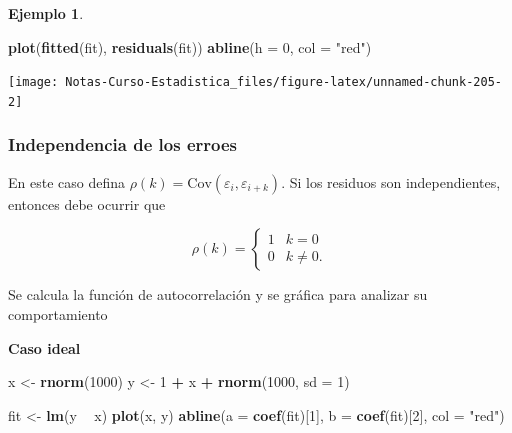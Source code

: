 \documentclass[
  12pt,
]{book}
\newenvironment{Shaded}{\begin{snugshade}}{\end{snugshade}}
\newcommand{\DataTypeTok}[1]{\textcolor[rgb]{0.13,0.29,0.53}{#1}}
\newcommand{\DecValTok}[1]{\textcolor[rgb]{0.00,0.00,0.81}{#1}}
\newcommand{\KeywordTok}[1]{\textcolor[rgb]{0.13,0.29,0.53}{\textbf{#1}}}
\newcommand{\NormalTok}[1]{#1}
\newcommand{\OperatorTok}[1]{\textcolor[rgb]{0.81,0.36,0.00}{\textbf{#1}}}
\newcommand{\StringTok}[1]{\textcolor[rgb]{0.31,0.60,0.02}{#1}}
\theoremstyle{definition}
\theoremstyle{definition}
\newtheorem{example}{Ejemplo}[chapter]
\theoremstyle{definition}
\theoremstyle{remark}
\begin{document}
\begin{example}
\begin{Shaded}
\begin{Highlighting}[]
\KeywordTok{plot}\NormalTok{(}\KeywordTok{fitted}\NormalTok{(fit), }\KeywordTok{residuals}\NormalTok{(fit))}
\KeywordTok{abline}\NormalTok{(}\DataTypeTok{h =} \DecValTok{0}\NormalTok{, }\DataTypeTok{col =} \StringTok{"red"}\NormalTok{)}
\end{Highlighting}
\end{Shaded}

\begin{center}\texttt{[image: Notas-Curso-Estadistica\_files/figure-latex/unnamed-chunk-205-2]} \end{center}

\end{example}

\hypertarget{independencia-de-los-erroes}{%
\subsubsection{Independencia de los erroes}\label{independencia-de-los-erroes}}

En este caso defina \(\rho(k) = \text{Cov}(\varepsilon_i,\varepsilon_{i+k} )\). Si los residuos son independientes, entonces debe ocurrir que

\begin{equation*}
\rho(k) = \begin{cases}
1 & k=0\\
0 & k\neq 0.
\end{cases}  
\end{equation*}

Se calcula la función de autocorrelación y se gráfica para analizar su comportamiento

\textbf{Caso ideal}

\begin{Shaded}
\begin{Highlighting}[]
\NormalTok{x <-}\StringTok{ }\KeywordTok{rnorm}\NormalTok{(}\DecValTok{1000}\NormalTok{)}
\NormalTok{y <-}\StringTok{ }\DecValTok{1} \OperatorTok{+}\StringTok{ }\NormalTok{x }\OperatorTok{+}\StringTok{ }\KeywordTok{rnorm}\NormalTok{(}\DecValTok{1000}\NormalTok{, }\DataTypeTok{sd =} \DecValTok{1}\NormalTok{)}
\end{Highlighting}
\end{Shaded}

\begin{Shaded}
\begin{Highlighting}[]
\NormalTok{fit <-}\StringTok{ }\KeywordTok{lm}\NormalTok{(y }\OperatorTok{~}\StringTok{ }\NormalTok{x)}
\KeywordTok{plot}\NormalTok{(x, y)}
\KeywordTok{abline}\NormalTok{(}\DataTypeTok{a =} \KeywordTok{coef}\NormalTok{(fit)[}\DecValTok{1}\NormalTok{], }\DataTypeTok{b =} \KeywordTok{coef}\NormalTok{(fit)[}\DecValTok{2}\NormalTok{], }\DataTypeTok{col =} \StringTok{"red"}\NormalTok{)}
\end{Highlighting}
\end{Shaded}
\end{document}
